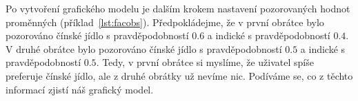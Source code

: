 %
%
%
%
%
%

Po vytvoření grafického modelu je dalším krokem nastavení pozorovaných hodnot proměnných (příklad~\ref{lst:facobs}).
Předpokládejme, že v první obrátce bylo pozorováno čínské jídlo s pravděpodobností $0.6$ a indické s pravděpodobností $0.4$.
V druhé obrátce bylo pozorováno čínské jídlo s pravděpodobností $0.5$ a indické s pravděpodobností $0.5$.
Tedy, v první obrátce si myslíme, že uživatel spíše preferuje čínské jídlo, ale z druhé obrátky už nevíme nic. 
Podíváme se, co z těchto informací zjistí náš grafický model.

